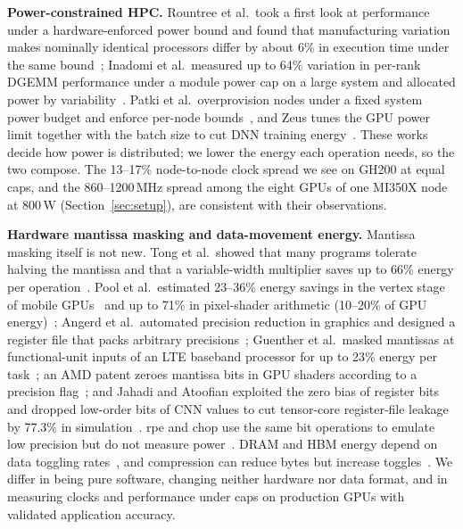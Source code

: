 \documentclass[conference]{IEEEtran}
\newcommand{\W}{\,W}
\newcommand{\pct}{\%}
\begin{document}
\textbf{Power-constrained HPC.} Rountree et al.\ took a first look at performance under a hardware-enforced power
bound and found that manufacturing variation makes nominally identical processors differ by about 6\pct{} in
execution time under the same bound~\cite{Rountree2012}; Inadomi et al.\ measured up to 64\pct{} variation in per-rank DGEMM
performance under a module power cap on a large system and allocated power by variability~\cite{Inadomi2015}.
Patki et al.\ overprovision nodes under a fixed system power budget and enforce per-node bounds~\cite{Patki2013},
and Zeus tunes the GPU power limit together with the batch size to cut DNN training energy~\cite{Zeus2023}. These
works decide how power is distributed; we lower the energy each operation needs, so the two compose. The 13--17\pct{}
node-to-node clock spread we see on GH200 at equal caps, and the 860--1200\,MHz spread among the eight GPUs of one
MI350X node at 800\W{} (Section~\ref{sec:setup}), are consistent with their observations.

\textbf{Hardware mantissa masking and data-movement energy.} Mantissa masking itself is not new. Tong et al.\
showed that many programs tolerate halving the mantissa and that a variable-width multiplier saves up to 66\pct{}
energy per operation~\cite{Tong2000}. Pool et al.\ estimated 23--36\pct{} energy savings in the vertex stage of
mobile GPUs~\cite{Pool2008} and up to 71\pct{} in pixel-shader arithmetic (10--20\pct{} of GPU
energy)~\cite{Pool2011}; Angerd et al.\ automated precision reduction in graphics and designed a register file that
packs arbitrary precisions~\cite{Angerd2017}; Guenther et al.\ masked mantissas at functional-unit inputs of an LTE
baseband processor for up to 23\pct{} energy per task~\cite{Guenther2016}; an AMD patent zeroes mantissa bits in
GPU shaders according to a precision flag~\cite{AMD2022}; and Jahadi and Atoofian exploited the zero bias of
register bits and dropped low-order bits of CNN values to cut tensor-core register-file leakage by
77.3\pct{} in simulation~\cite{Jahadi2024}. rpe and chop use the same bit operations to emulate low precision but
do not measure power~\cite{Dawson2017,Higham2019}. DRAM and HBM energy depend on data toggling
rates~\cite{Chatterjee2017,OConnor2017,Ghose2018}, and compression can reduce bytes but increase
toggles~\cite{Pekhimenko2016}. We differ in being pure software, changing neither hardware nor data format, and in
measuring clocks and performance under caps on production GPUs with validated application accuracy.
\end{document}
